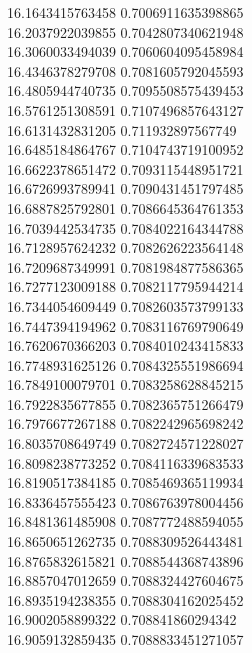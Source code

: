 {16.1643415763458 0.7006911635398865 \\
16.2037922039855 0.7042807340621948 \\
16.3060033494039 0.7060604095458984 \\
16.4346378279708 0.7081605792045593 \\
16.4805944740735 0.7095508575439453 \\
16.5761251308591 0.7107496857643127 \\
16.6131432831205 0.711932897567749 \\
16.6485184864767 0.7104743719100952 \\
16.6622378651472 0.7093115448951721 \\
16.6726993789941 0.7090431451797485 \\
16.6887825792801 0.7086645364761353 \\
16.7039442534735 0.7084022164344788 \\
16.7128957624232 0.7082626223564148 \\
16.7209687349991 0.7081984877586365 \\
16.7277123009188 0.7082117795944214 \\
16.7344054609449 0.7082603573799133 \\
16.7447394194962 0.7083116769790649 \\
16.7620670366203 0.7084010243415833 \\
16.7748931625126 0.7084325551986694 \\
16.7849100079701 0.7083258628845215 \\
16.7922835677855 0.7082365751266479 \\
16.7976677267188 0.7082242965698242 \\
16.8035708649749 0.7082724571228027 \\
16.8098238773252 0.7084116339683533 \\
16.8190517384185 0.7085469365119934 \\
16.8336457555423 0.7086763978004456 \\
16.8481361485908 0.7087772488594055 \\
16.8650651262735 0.7088309526443481 \\
16.8765832615821 0.7088544368743896 \\
16.8857047012659 0.7088324427604675 \\
16.8935194238355 0.7088304162025452 \\
16.9002058899322 0.708841860294342 \\
16.9059132859435 0.7088833451271057 \\
}
